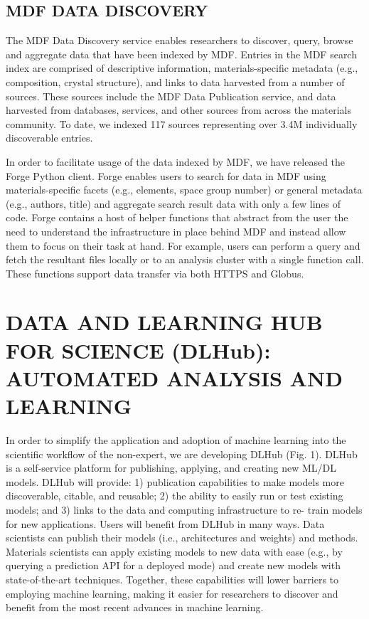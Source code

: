 \documentclass{aip-cp}
\begin{document}
\subsection{MDF DATA DISCOVERY} 
The MDF Data Discovery service enables
researchers to discover, query, browse and aggregate data that have been
indexed by MDF. Entries in the MDF search index are comprised of descriptive
information, materials-specific metadata (e.g., composition, crystal
structure), and links to data harvested from a number of sources. These
sources include the MDF Data Publication service, and
data harvested from databases, services, and other sources from across the
materials community. To date, we indexed 117 sources representing over 3.4M
individually discoverable entries.

In order to facilitate usage of the data indexed by MDF, we have released the
Forge Python client. Forge enables users to search for data in MDF using
materials-specific facets (e.g., elements, space group number) or general
metadata (e.g., authors, title) and aggregate search result data with only a
few lines of code. Forge contains a host of helper functions that
abstract from the user the need to understand the infrastructure in place
behind MDF and instead allow them to focus on their task at hand. For example,
users can perform a query and fetch the resultant files locally or to an
analysis cluster with a single function call. These functions support data
transfer via both HTTPS and Globus.



\section{DATA AND LEARNING HUB FOR SCIENCE (DLHub): AUTOMATED ANALYSIS AND LEARNING}

In order to simplify the application and adoption of machine learning into the
scientific workflow of the non-expert, we are developing DLHub (Fig. 1). DLHub
is a self-service platform for publishing, applying, and creating new ML/DL
models. DLHub will provide: 1) publication capabilities to make models more
discoverable, citable, and reusable; 2) the ability to easily run or test
existing models; and 3) links to the data and computing infrastructure to re-
train models for new applications. Users will benefit from DLHub in many ways.
Data scientists can publish their models (i.e., architectures and weights) and
methods. Materials scientists can apply existing models to new data with ease
(e.g., by querying a prediction API for a deployed mode) and create new models
with state-of-the-art techniques. Together, these capabilities will lower
barriers to employing machine learning, making it easier for researchers to
discover and benefit from the most recent advances in machine learning.
\end{document}
